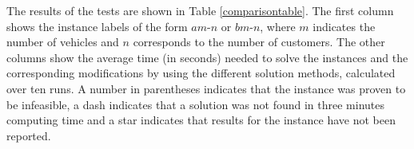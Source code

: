 \documentclass[dissertation,draft*]{aaltoseries}
\begin{document}
The results of the tests are shown in Table \ref{comparisontable}. The first
column shows the instance labels of the form $am$-$n$ or $bm$-$n$, where $m$
indicates the number of vehicles and $n$ corresponds to the number of customers.
The other columns show the average time (in seconds) needed to solve the
instances and the corresponding modifications by using the different solution methods,
calculated over ten runs. 
A number in parentheses indicates that the instance was proven to be infeasible,
a dash indicates that a solution was not found in three minutes computing time and
a star indicates that results for the instance have not been reported. 
\end{document}
